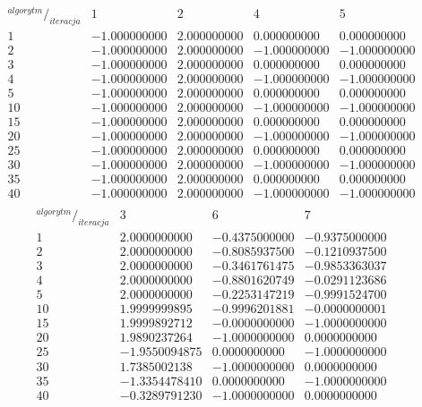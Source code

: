 $$
\begin{array}{c|c|c|c|c}
^{algorytm}/_{iteracja} & 1 & 2 & 4 & 5\\
\hline
1 & -1.000000000 & 2.000000000 & 0.000000000 & 0.000000000 \\
2 & -1.000000000 & 2.000000000 & -1.000000000 & -1.000000000 \\
3 & -1.000000000 & 2.000000000 & 0.000000000 & 0.000000000 \\
4 & -1.000000000 & 2.000000000 & -1.000000000 & -1.000000000 \\
5 & -1.000000000 & 2.000000000 & 0.000000000 & 0.000000000 \\
10 & -1.000000000 & 2.000000000 & -1.000000000 & -1.000000000 \\
15 & -1.000000000 & 2.000000000 & 0.000000000 & 0.000000000 \\
20 & -1.000000000 & 2.000000000 & -1.000000000 & -1.000000000 \\
25 & -1.000000000 & 2.000000000 & 0.000000000 & 0.000000000 \\
30 & -1.000000000 & 2.000000000 & -1.000000000 & -1.000000000 \\
35 & -1.000000000 & 2.000000000 & 0.000000000 & 0.000000000 \\
40 & -1.000000000 & 2.000000000 & -1.000000000 & -1.000000000 \\
\end{array}
$$
$$
\begin{array}{c|c|c|c}
^{algorytm}/_{iteracja} & 3 & 6 & 7\\
\hline
1 & 2.0000000000 & -0.4375000000 & -0.9375000000 \\
2 & 2.0000000000 & -0.8085937500 & -0.1210937500 \\
3 & 2.0000000000 & -0.3461761475 & -0.9853363037 \\
4 & 2.0000000000 & -0.8801620749 & -0.0291123686 \\
5 & 2.0000000000 & -0.2253147219 & -0.9991524700 \\
10 & 1.9999999895 & -0.9996201881 & -0.0000000001 \\
15 & 1.9999892712 & -0.0000000000 & -1.0000000000 \\
20 & 1.9890237264 & -1.0000000000 & 0.0000000000 \\
25 & -1.9550094875 & 0.0000000000 & -1.0000000000 \\
30 & 1.7385002138 & -1.0000000000 & 0.0000000000 \\
35 & -1.3354478410 & 0.0000000000 & -1.0000000000 \\
40 & -0.3289791230 & -1.0000000000 & 0.0000000000 \\
\end{array}
$$

